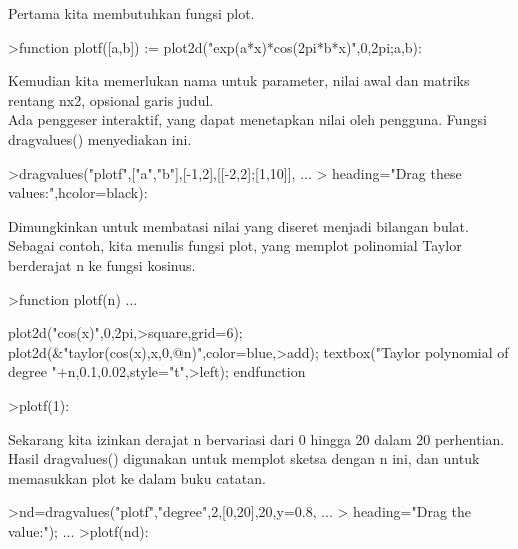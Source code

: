 \documentclass[a4paper,10pt]{article}
\begin{document}
\begin{eulernotebook}
\begin{eulercomment}
\begin{eulercomment}
\begin{eulercomment}
\begin{eulercomment}
\begin{eulercomment}
\begin{eulercomment}
\begin{eulercomment}
Pertama kita membutuhkan fungsi plot.
\end{eulercomment}
\begin{eulerprompt}
>function plotf([a,b]) := plot2d("exp(a*x)*cos(2pi*b*x)",0,2pi;a,b):
\end{eulerprompt}
\begin{eulercomment}
Kemudian kita memerlukan nama untuk parameter, nilai awal dan matriks
rentang nx2, opsional garis judul.\\
Ada penggeser interaktif, yang dapat menetapkan nilai oleh pengguna.
Fungsi dragvalues() menyediakan ini.
\end{eulercomment}
\begin{eulerprompt}
>dragvalues("plotf",["a","b"],[-1,2],[[-2,2];[1,10]], ...
>  heading="Drag these values:",hcolor=black):
\end{eulerprompt}
\begin{eulercomment}
Dimungkinkan untuk membatasi nilai yang diseret menjadi bilangan
bulat. Sebagai contoh, kita menulis fungsi plot, yang memplot
polinomial Taylor berderajat n ke fungsi kosinus.
\end{eulercomment}
\begin{eulerprompt}
>function plotf(n) ...
\end{eulerprompt}
\begin{eulerudf}
  plot2d("cos(x)",0,2pi,>square,grid=6);
  plot2d(&"taylor(cos(x),x,0,@n)",color=blue,>add);
  textbox("Taylor polynomial of degree "+n,0.1,0.02,style="t",>left);
  endfunction
\end{eulerudf}
\begin{eulerprompt}
>plotf(1):
\end{eulerprompt}
\begin{eulercomment}
Sekarang kita izinkan derajat n bervariasi dari 0 hingga 20 dalam 20
perhentian. Hasil dragvalues() digunakan untuk memplot sketsa dengan n
ini, dan untuk memasukkan plot ke dalam buku catatan.
\end{eulercomment}
\begin{eulerprompt}
>nd=dragvalues("plotf","degree",2,[0,20],20,y=0.8, ...
>   heading="Drag the value:"); ...
>plotf(nd):

\end{eulerprompt}
\end{eulercomment}
\end{eulercomment}
\end{eulercomment}
\end{eulercomment}
\end{eulercomment}
\end{eulercomment}
\end{eulernotebook}
\end{document}
